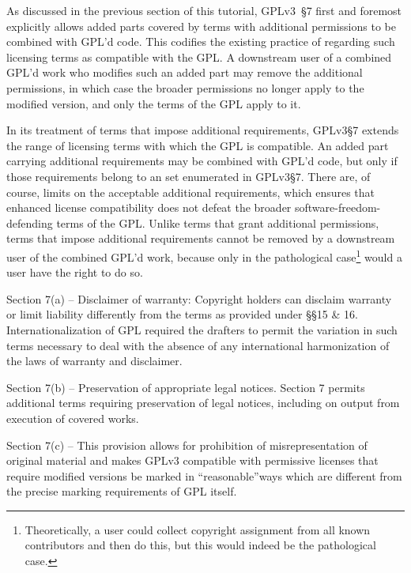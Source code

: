 As discussed in the previous section of this tutorial, GPLv3~\S7 first and foremost explicitly allows added parts covered by terms with
additional permissions to be combined with GPL'd code. This codifies the
existing practice of regarding such licensing terms as compatible with the
GPL\@. A downstream user of a combined GPL'd work who modifies such an added
part may remove the additional permissions, in which case the broader
permissions no longer apply to the modified version, and only the terms of
the GPL apply to it.

In its treatment of terms that impose additional requirements, GPLv3\S7
extends the range of licensing terms with which the GPL is compatible.  An
added part carrying additional requirements may be combined with GPL'd code,
but only if those requirements belong to an set enumerated in GPLv3\S7. There
are, of course,  limits on the acceptable additional requirements, which 
ensures that enhanced license compatibility does not
defeat the broader software-freedom-defending terms of the GPL\@. Unlike terms that grant
additional permissions, terms that impose additional requirements cannot be
removed by a downstream user of the combined GPL'd work, because only in the
pathological case\footnote{Theoretically, a user could collect copyright
  assignment from all known contributors and then do this, but this would
  indeed be the pathological case.}  would a user have the right to do so.




Section 7(a) – Disclaimer of warranty: Copyright holders can disclaim
warranty or limit liability differently from the terms as provided under \S\S15
& 16. Internationalization of GPL required the drafters to permit the
variation in such terms necessary to deal with the absence of any
international harmonization of the laws of warranty and disclaimer.

Section 7(b) – Preservation of appropriate legal notices. Section 7 permits
additional terms requiring preservation of legal notices, including on output
from execution of covered works.

Section 7(c) – This provision allows for prohibition of misrepresentation of
original material and makes GPLv3 compatible with permissive licenses that
require modified versions be marked in ``reasonable''ways which are different
from the precise marking requirements of GPL itself.

